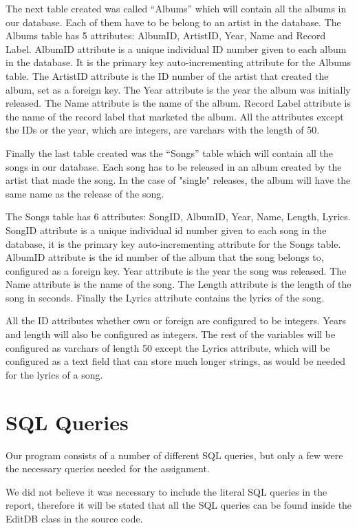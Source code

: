 \documentclass[a4paper,12pt]{article}
\begin{document}
The next table created was called “Albums” which will contain all the albums in our database. Each of them have to be belong to an artist in the database. The Albums table has 5 attributes: AlbumID, ArtistID, Year, Name and Record Label. AlbumID attribute is a unique individual ID number given to each album in the database. It is the primary key auto-incrementing attribute for the Albums table. The ArtistID attribute is the ID number of the artist that created the album, set as a foreign key. The Year attribute is the year the album was initially released. The Name attribute is the name of the album. Record Label attribute is the name of the record label that marketed the album.
All the attributes except the IDs or the year, which are integers, are varchars with the length of 50.

Finally the last table created was the “Songs” table which will contain all the songs in our database. Each song has to be released in  an album created by the artist that made the song. In the case of "single" releases, the album will have the same name as the release of the song.


The Songs table has 6 attributes: SongID, AlbumID, Year, Name, Length, Lyrics.
SongID attribute is a unique individual id number given to each song in the database, it is the primary key auto-incrementing  attribute for the Songs table. AlbumID attribute is the id number of the album that the song belongs to, configured as a foreign key. Year attribute is the year the song was released. The Name attribute is the name of the song. The Length attribute is the length of the song in seconds. Finally the Lyrics attribute contains the lyrics of the song.


All the ID attributes whether own or foreign are configured to be integers. Years and length will also be configured as integers. The rest of the variables will be configured as varchars of length 50 except the Lyrics attribute, which will be configured as a text field that can store much longer strings, as would be needed for the lyrics of a song.

\clearpage


\section{SQL Queries}

Our program consists of a number of different SQL queries, but only a few were the necessary queries needed for the assignment.

We did not believe it was necessary to include the literal SQL queries in the report, therefore it will be stated that all the SQL queries can be found inside the EditDB class in the source code.
\end{document}
